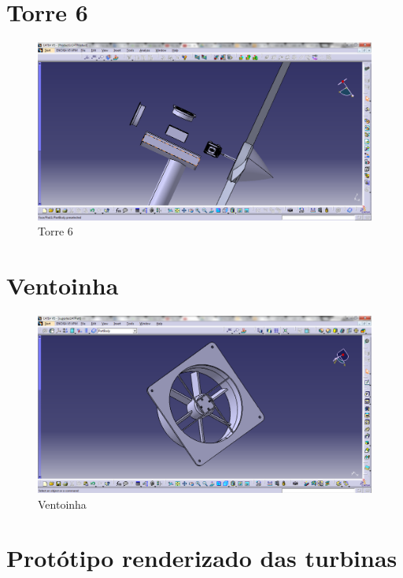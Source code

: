 \section{Torre 6}
\begin{figure}[!htbp]
	  \centering
	  \includegraphics[scale=0.45]{editaveis/figuras/C_torre6}
	  \caption[Torre6]{Torre 6}
	  \label{Torre6}
	\end{figure}
	\FloatBarrier

\section{Ventoinha}
\begin{figure}[!htbp]
	  \centering
	  \includegraphics[scale=0.45]{editaveis/figuras/C_Ventoinha}
	  \caption[Ventoinha]{Ventoinha}
	  \label{Torre6}
	\end{figure}
	\FloatBarrier

\section{Protótipo renderizado das turbinas}
 
